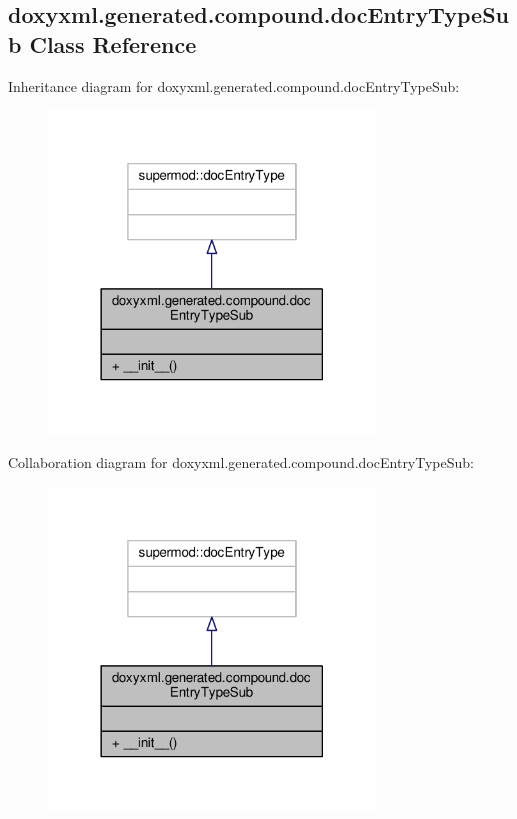 \subsection{doxyxml.\+generated.\+compound.\+doc\+Entry\+Type\+Sub Class Reference}
\label{classdoxyxml_1_1generated_1_1compound_1_1docEntryTypeSub}


Inheritance diagram for doxyxml.\+generated.\+compound.\+doc\+Entry\+Type\+Sub\+:
\nopagebreak
\begin{figure}[H]
\begin{center}
\leavevmode
\includegraphics[width=246pt]{d1/d5a/classdoxyxml_1_1generated_1_1compound_1_1docEntryTypeSub__inherit__graph}
\end{center}
\end{figure}


Collaboration diagram for doxyxml.\+generated.\+compound.\+doc\+Entry\+Type\+Sub\+:
\nopagebreak
\begin{figure}[H]
\begin{center}
\leavevmode
\includegraphics[width=246pt]{d4/d4b/classdoxyxml_1_1generated_1_1compound_1_1docEntryTypeSub__coll__graph}
\end{center}
\end{figure}
